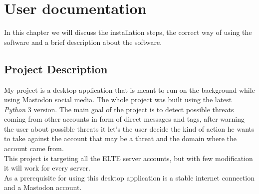 \chapter{User documentation}
\label{ch:user}

In this chapter we will discuss the installation steps,
the correct way of using the software and a brief description
about the software.


\section{Project Description}
\label{s:project_desc}

My project is a desktop application that is meant to run 
on the background while using Mastodon social media. The
whole project was built using the latest \textit{Python} 3 version.
The main goal of the project is to detect possible
threats coming from other accounts in form of direct
messages and tags, after warning the user about possible 
threats it let's the user decide the kind of action
he wants to take against the account that may be a threat
and the domain where the account came from.
\\[5pt]
This project is targeting all the ELTE server accounts, but with few modification
it will work for every server.
\\[5pt]
As a prerequisite for using this desktop application is
a stable internet connection and a Mastodon account.


